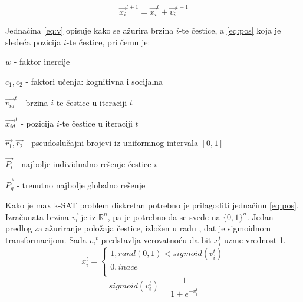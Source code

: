 \documentclass[a4paper]{article}
\begin{document}
\begin{equation}\label{eq:pos}
\vec{x_{i}}^{t+1} = \vec{x_{i}}^{t} + \vec{v_{i}}^{t+1} 
\end{equation}

Jednačina \ref{eq:v} opisuje kako se ažurira brzina $i$-te čestice, a \ref{eq:pos} koja je sledeća pozicija $i$-te čestice, pri čemu je: 

\begin{list}{•}{}
	\item $w$ - faktor inercije
	\item $c_1, c_2$ - faktori učenja: kognitivna i socijalna
	\item $\vec{v_{id}}^{t}$ - brzina $i$-te čestice u iteraciji $t$ 
	\item $\vec{x_{id}}^{t}$ - pozicija $i$-te čestice u iteraciji $t$ 
	\item $\vec{r_1}, \vec{r_2}$ - pseudoslučajni brojevi iz uniformnog intervala $[0,1]$
	\item $\vec{P_i}$ - najbolje individualno rešenje čestice $i$
	\item $\vec{P_g}$ - trenutno najbolje globalno rešenje\\ 
\end{list}

Kako je max k-SAT problem diskretan potrebno je prilagoditi jednačinu \ref{eq:pos}. Izračunata brzina $\vec{v_{i}}$ je iz $\mathbb{R}^n$, pa je potrebno da se svede na $\{ 0,1 \}^n$. Jedan predlog za ažuriranje položaja čestice, izložen u radu \cite{sigmoid}, dat je sigmoidnom transformacijom. Sada ${v_{i}}^{t}$ predstavlja verovatnoću da bit $x_{i}^{t}$ uzme vrednost 1.  \\

\begin{equation}\label{eq:posSIGMOID}
x_{i}^{t}=\begin{cases}
               1, rand(0,1) < sigmoid(v_{i}^{t})\\
               0, inace\\
            \end{cases}
\end{equation}\label{eq:sigmoid}
\begin{equation}
sigmoid(v_{i}^{t}) = \frac{1}{1+e^{-v_{i}^{t}}}
\end{equation}
 
 
\end{document}
